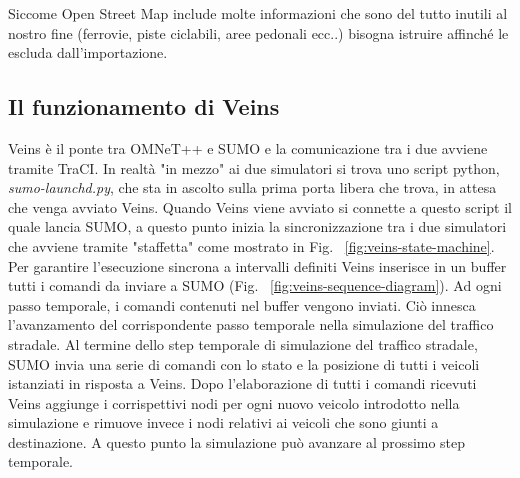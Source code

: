 Siccome Open Street Map include molte informazioni che sono del tutto inutili al nostro fine (ferrovie, piste ciclabili, aree pedonali ecc..) bisogna istruire  affinché le escluda dall'importazione. 



 
\subsection{Il funzionamento di Veins}

Veins è il ponte tra OMNeT++ e SUMO e la comunicazione tra i due avviene tramite TraCI. In realtà "in mezzo" ai due simulatori si trova uno script python, \emph{sumo-launchd.py}, che sta in ascolto sulla prima porta libera che trova, in attesa che venga avviato Veins. Quando Veins viene avviato si connette a questo script il quale lancia SUMO, a questo punto inizia la sincronizzazione tra i due simulatori che avviene tramite "staffetta" come mostrato in Fig. ~\ref{fig:veins-state-machine}. Per garantire l'esecuzione sincrona a intervalli definiti Veins inserisce in un buffer tutti i comandi da inviare a SUMO (Fig.  ~\ref{fig:veins-sequence-diagram}). Ad ogni passo temporale, i comandi contenuti nel buffer vengono inviati. Ciò innesca l'avanzamento del corrispondente passo temporale nella simulazione del traffico stradale. Al termine dello step temporale di simulazione del traffico stradale, SUMO invia una serie di comandi con lo stato e la posizione di tutti i veicoli istanziati in risposta a Veins. Dopo l'elaborazione di tutti i comandi ricevuti Veins aggiunge i corrispettivi nodi per ogni nuovo veicolo introdotto nella simulazione e rimuove invece i nodi relativi ai veicoli che sono giunti a destinazione. A questo punto la simulazione può avanzare al prossimo step temporale.

